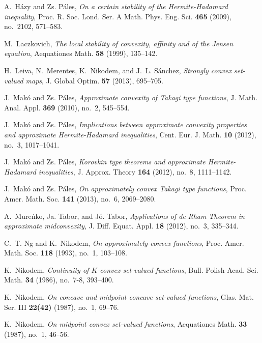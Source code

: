 \documentclass[12pt,reqno]{amsart}
\theoremstyle{definition}
\begin{document}
\begin{thebibliography}{10}
A.~Házy and Zs. Páles, \emph{{On a certain stability of the {H}ermite-{H}adamard
  inequality}}, Proc. R. Soc. Lond. Ser. A Math. Phys. Eng. Sci. \textbf{465}
  (2009), no.~2102, 571–583. 

M.~Laczkovich, \emph{The local stability of convexity, affinity and of the
  {J}ensen equation}, Aequationes Math. \textbf{58} (1999), 135–142.

H.~Leiva, N.~Merentes, K.~Nikodem, and J.~L. Sánchez, \emph{Strongly convex
  set-valued maps}, J. Global Optim. \textbf{57} (2013), 695–705.

J.~Makó and Zs. Páles, \emph{{Approximate convexity of {T}akagi type
  functions}}, J. Math. Anal. Appl. \textbf{369} (2010), no.~2, 545–554.

J.~Makó and Zs. Páles, \emph{{Implications between approximate convexity properties and
  approximate {H}ermite-{H}adamard inequalities}}, Cent. Eur. J. Math.
  \textbf{10} (2012), no.~3, 1017–1041. 

J.~Makó and Zs. Páles, \emph{{Korovkin type theorems and approximate {H}ermite-{H}adamard
  inequalities}}, J. Approx. Theory \textbf{164} (2012), no.~8, 1111–1142.

J.~Makó and Zs. Páles, \emph{{On approximately convex {T}akagi type functions}}, Proc. Amer.
  Math. Soc. \textbf{141} (2013), no.~6, 2069–2080. 

A.~Mureńko, Ja. Tabor, and Jó. Tabor, \emph{Applications of de {R}ham
  {T}heorem in approximate midconvexity}, J. Diff. Equat. Appl. \textbf{18}
  (2012), no.~3, 335–344. 

C.~T. Ng and K.~Nikodem, \emph{On approximately convex functions}, Proc. Amer.
  Math. Soc. \textbf{118} (1993), no.~1, 103–108. 

K.~Nikodem, \emph{Continuity of {$K$}-convex set-valued functions}, Bull.
  Polish Acad. Sci. Math. \textbf{34} (1986), no.~7-8, 393–400. 

K.~Nikodem, \emph{On concave and midpoint concave set-valued functions}, Glas.
  Mat. Ser. III \textbf{22(42)} (1987), no.~1, 69–76. 

K.~Nikodem, \emph{On midpoint convex set-valued functions}, Aequationes Math.
  \textbf{33} (1987), no.~1, 46–56. 


\end{thebibliography}
\end{document}
